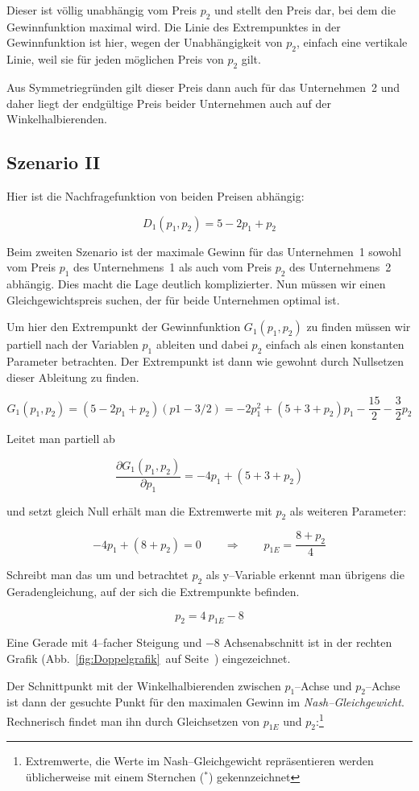 \documentclass[paper=a4,notitlepage,parskip=half,plainheadsepline]{scrartcl}
\begin{document}
Dieser ist völlig unabhängig vom Preis $p_2$ und stellt den Preis dar, bei dem die Gewinnfunktion maximal wird.
Die Linie des Extrempunktes in der Gewinnfunktion ist hier, wegen der Unabhängigkeit von $p_2$,  einfach eine vertikale Linie, weil sie für jeden möglichen
 Preis von $p_2$ gilt.

Aus Symmetriegründen gilt dieser Preis dann auch für das Unternehmen~2 und daher liegt der endgültige Preis beider Unternehmen auch auf der Winkelhalbierenden.

\subsection{Szenario II}
Hier ist die Nachfragefunktion von beiden Preisen abhängig:

$$D_1(p_1,p_2) = 5 - 2 p_1 + p_2$$

Beim zweiten Szenario ist der maximale Gewinn für das Unternehmen~1 sowohl vom Preis $p_1$ des Unternehmens~1 
als auch vom Preis $p_2$ des Unternehmens~2 abhängig. Dies macht die Lage deutlich komplizierter. 
Nun müssen wir einen Gleichgewichtspreis suchen, der für beide Unternehmen optimal ist.

Um hier den Extrempunkt der Gewinnfunktion $G_1(p_1,p_2)$ zu finden müssen wir partiell nach der Variablen $p_1$ ableiten und dabei $p_2$ einfach als einen
konstanten Parameter betrachten. Der Extrempunkt ist dann wie gewohnt durch Nullsetzen dieser Ableitung zu finden.

$$G_1(p_1,p_2)= (5- 2 p_1 + p_2) (p1-3/2)  = -2 p_1^2 + (5+3+p_2) p_1 - \frac{15}{2} - \frac{3}{2}p_2$$

Leitet man partiell ab

$$\frac{\partial G_1(p_1,p_2)}{\partial p_1} = -4 p_1 + (5+3+p_2)$$

und setzt gleich Null erhält man die Extremwerte mit $p_2$ als weiteren Parameter:

$$ -4 p_1 + (8+p_2) = 0     \qquad \Rightarrow \qquad p_{1E} = \frac{8+p_2}{4}$$

Schreibt man das um und betrachtet $p_2$ als y--Variable erkennt man übrigens die Geradengleichung, auf der sich die Extrempunkte befinden.

$$p_2 = 4 \ p_{1E} -8$$

Eine Gerade mit $4$--facher Steigung und $-8$ Achsenabschnitt ist in der rechten Grafik (Abb.~\ref{fig:Doppelgrafik}~auf Seite~\pageref{fig:Doppelgrafik}) eingezeichnet.

Der Schnittpunkt mit der Winkelhalbierenden zwischen $p_1$--Achse und $p_2$--Achse ist dann der gesuchte Punkt für den maximalen Gewinn im \emph{Nash--Gleichgewicht}. 
Rechnerisch findet man ihn durch Gleichsetzen von $p_{1E}$ und $p_2$:\footnote{Extremwerte, die Werte im Nash--Gleichgewicht repräsentieren werden üblicherweise mit einem Sternchen ($^*$) gekennzeichnet}
\end{document}
